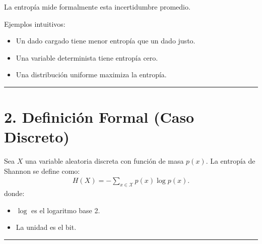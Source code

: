 \documentclass[letterpaper,10pt,english]{jupyterBook}
\begin{document}
\sphinxAtStartPar
La entropía mide formalmente esta incertidumbre promedio.

\sphinxAtStartPar
Ejemplos intuitivos:
\begin{itemize}
\item {} 
\sphinxAtStartPar
Un dado cargado tiene menor entropía que un dado justo.

\item {} 
\sphinxAtStartPar
Una variable determinista tiene entropía cero.

\item {} 
\sphinxAtStartPar
Una distribución uniforme maximiza la entropía.

\end{itemize}


\bigskip\hrule\bigskip



\section{2. Definición Formal (Caso Discreto)}
\label{\detokenize{01_theory/entropy:definicion-formal-caso-discreto}}
\sphinxAtStartPar
Sea \(X\) una variable aleatoria discreta con función de masa \(p(x)\). La entropía de Shannon se define como:
\begin{equation*}
\begin{split}
H(X) = -\sum_{x \in \mathcal{X}} p(x)\log p(x).
\end{split}
\end{equation*}
\sphinxAtStartPar
donde:
\begin{itemize}
\item {} 
\sphinxAtStartPar
\(\log\) es el logaritmo base 2.

\item {} 
\sphinxAtStartPar
La unidad es el bit.

\end{itemize}


\bigskip\hrule\bigskip
\end{document}
